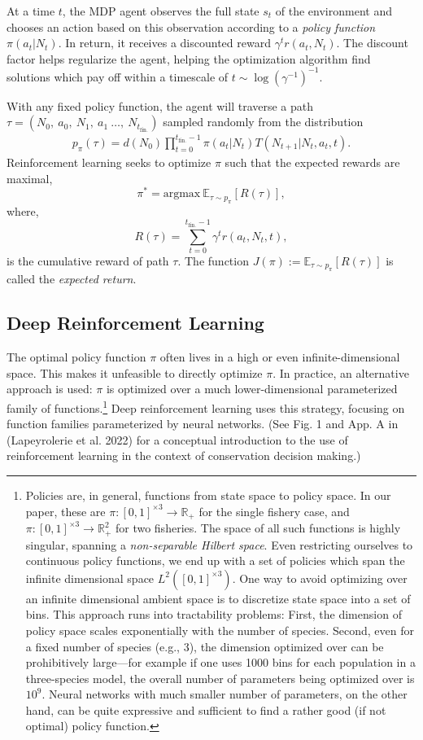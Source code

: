 \documentclass{article}
\begin{document}
At a time \(t\), the MDP agent observes the full state \(s_t\) of the
environment and chooses an action based on this observation according to
a \emph{policy function} \(\pi(a_t | N_t)\). In return, it receives a
discounted reward \(\gamma^t r(a_t, N_t)\). The discount factor helps
regularize the agent, helping the optimization algorithm find solutions
which pay off within a timescale of \(t \sim \log(\gamma^{-1})^{-1}\).

With any fixed policy function, the agent will traverse a path
\(\tau=(N_0,\ a_0,\ N_1,\ a_1\ \dots,\ N_{t_{\text{fin.}}})\) sampled
randomly from the distribution \begin{align*}
  p_\pi(\tau) = 
  d(N_0) \prod_{t=0}^{ t_{\text{fin.}}-1 }
  \pi( a_t | N_t ) T( N_{t+1} | N_t, a_t, t ).
\end{align*} Reinforcement learning seeks to optimize \(\pi\) such that
the expected rewards are maximal, \[  
  \pi^* = \mathrm{argmax}\ \mathbb{E}_{\tau\sim p_\pi}[R(\tau)],
\] where, \[
  R(\tau) = \sum_{t=0}^{ t_{\text{fin.}}-1 } \gamma^t r(a_t, N_t, t),
\] is the cumulative reward of path \(\tau\). The function
\(J(\pi):=\mathbb{E}_{\tau\sim p_\pi}[R(\tau)]\) is called the
\emph{expected return}.

\hypertarget{deep-reinforcement-learning}{%
\subsection{Deep Reinforcement
Learning}\label{deep-reinforcement-learning}}

The optimal policy function \(\pi\) often lives in a high or even
infinite-dimensional space. This makes it unfeasible to directly
optimize \(\pi\). In practice, an alternative approach is used: \(\pi\)
is optimized over a much lower-dimensional parameterized family of
functions.\footnote{
Policies are, in general, functions from state space to policy space.
In our paper, these are $\pi:[0,1]^{\times 3}\to \mathbb{R}_+$ for the single fishery case, and $\pi:[0,1]^{\times 3}\to \mathbb{R}_+^2$ for two fisheries.
The space of all such functions is highly singular, spanning a \emph{non-separable Hilbert space}.
Even restricting ourselves to continuous policy functions, we end up with a set of policies which span the infinite dimensional space $L^2([0,1]^{\times3})$.
One way to avoid optimizing over an infinite dimensional ambient space is to discretize state space into a set of bins.
This approach runs into tractability problems: First, the dimension of policy space scales exponentially with the number of species.
Second, even for a fixed number of species (e.g., 3), the dimension optimized over can be prohibitively large---for example if one uses 1000 bins for each population in a three-species model, the overall number of parameters being optimized over is $10^9$.
Neural networks with much smaller number of parameters, on the other hand, can be quite expressive and sufficient to find a rather good (if not optimal) policy function.
} Deep reinforcement learning uses this strategy, focusing on function
families parameterized by neural networks. (See Fig. 1 and App. A in
(Lapeyrolerie et al. 2022) for a conceptual introduction to the use of
reinforcement learning in the context of conservation decision making.)
\end{document}
